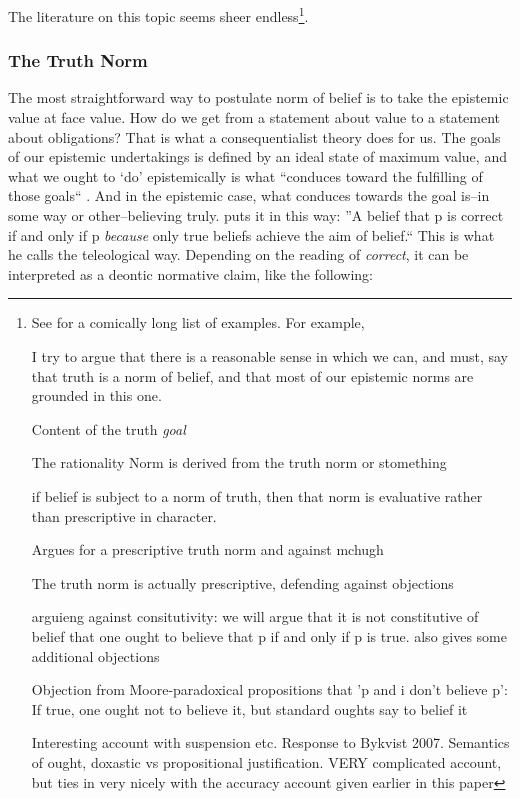 \documentclass[12pt,numbers=noenddot]{scrartcl}
\begin{document}
The literature on this topic seems sheer endless\footnote{
See \textcite[25]{Mchugh2012-MCHTTN} for a comically long list of examples.
    For example,

\textcite{Engel2001}
I try to argue that there is a reasonable sense in which we can, and must, say that truth is a norm of belief, and that most of our epistemic norms are grounded in this one.

\textcite{David2001-DAVTAT-7}
Content of the truth \emph{goal}

\textcite[101]{Boghossian2008-BOGCAJ}
The rationality Norm is derived from the truth norm or stomething

\textcite{Mchugh2012-MCHTTN}
if belief is subject to a norm of truth, then that norm is evaluative rather than prescriptive in character.

\textcite{Greenberg2016-GREITN}
Argues for a prescriptive truth norm and against mchugh

\textcite{Whiting2013-WHITTA-3}
The truth norm is actually prescriptive, defending against objections

\textcite{Bykvist2007-BYKDTI}
arguieng against consitutivity: we will argue that it is not constitutive of belief that one ought to believe that p if and only if p is true.
also gives some additional objections

Objection from Moore-paradoxical propositions that 'p and i don't believe p': If true, one ought not to believe it, but standard oughts say to belief it

\textcite{Wedgwood2013-WEDTRT}
Interesting account with suspension etc. Response to Bykvist 2007. Semantics of ought, doxastic vs propositional justification. VERY complicated account, but ties in very nicely with the accuracy account given earlier in this paper


}.

\subsubsection{The Truth Norm}







The most straightforward way to postulate norm of belief is to take the epistemic value at face value. How do we get from a statement about value to a statement about obligations? That is what a consequentialist theory does for us. The goals of our epistemic undertakings is defined by an ideal state of maximum value, and what we ought to ‘do’ epistemically is what “conduces toward the fulfilling of those goals“ \autocite[340]{Berker2013-BERETA-2}. And in the epistemic case, what conduces towards the goal is–in some way or other–believing truly. \textcite[35]{Engel199} puts it in this way: ”A belief that p is correct if and only if p \emph{because} only true beliefs achieve the aim of belief.“ This is what he calls the teleological way. Depending on the reading of \emph{correct}, it can be interpreted as a deontic normative claim, like the following:
\end{document}
